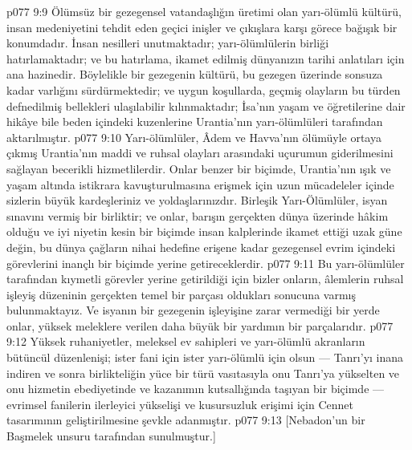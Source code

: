 \vs p077 9:9 Ölümsüz bir gezegensel vatandaşlığın üretimi olan yarı\hyp{}ölümlü kültürü, insan medeniyetini tehdit eden geçici inişler ve çıkışlara karşı görece bağışık bir konumdadır. İnsan nesilleri unutmaktadır; yarı\hyp{}ölümlülerin birliği hatırlamaktadır; ve bu hatırlama, ikamet edilmiş dünyanızın tarihi anlatıları için ana hazinedir. Böylelikle bir gezegenin kültürü, bu gezegen üzerinde sonsuza kadar varlığını sürdürmektedir; ve uygun koşullarda, geçmiş olayların bu türden defnedilmiş bellekleri ulaşılabilir kılınmaktadır; İsa’nın yaşam ve öğretilerine dair hikâye bile beden içindeki kuzenlerine Urantia’nın yarı\hyp{}ölümlüleri tarafından aktarılmıştır.
\vs p077 9:10 Yarı\hyp{}ölümlüler, Âdem ve Havva’nın ölümüyle ortaya çıkmış Urantia’nın maddi ve ruhsal olayları arasındaki uçurumun giderilmesini sağlayan becerikli hizmetlilerdir. Onlar benzer bir biçimde, Urantia’nın ışık ve yaşam altında istikrara kavuşturulmasına erişmek için uzun mücadeleler içinde sizlerin büyük kardeşleriniz ve yoldaşlarınızdır. Birleşik Yarı\hyp{}Ölümlüler, isyan sınavını vermiş bir birliktir; ve onlar, barışın gerçekten dünya üzerinde hâkim olduğu ve iyi niyetin kesin bir biçimde insan kalplerinde ikamet ettiği uzak güne değin, bu dünya çağların nihai hedefine erişene kadar gezegensel evrim içindeki görevlerini inançlı bir biçimde yerine getireceklerdir.
\vs p077 9:11 Bu yarı\hyp{}ölümlüler tarafından kıymetli görevler yerine getirildiği için bizler onların, âlemlerin ruhsal işleyiş düzeninin gerçekten temel bir parçası oldukları sonucuna varmış bulunmaktayız. Ve isyanın bir gezegenin işleyişine zarar vermediği bir yerde onlar, yüksek meleklere verilen daha büyük bir yardımın bir parçalarıdır.
\vs p077 9:12 Yüksek ruhaniyetler, meleksel ev sahipleri ve yarı\hyp{}ölümlü akranların bütüncül düzenlenişi; ister fani için ister yarı\hyp{}ölümlü için olsun --- Tanrı’yı inana indiren ve sonra birlikteliğin yüce bir türü vasıtasıyla onu Tanrı’ya yükselten ve onu hizmetin ebediyetinde ve kazanımın kutsallığında taşıyan bir biçimde --- evrimsel fanilerin ilerleyici yükselişi ve kusursuzluk erişimi için Cennet tasarımının geliştirilmesine şevkle adanmıştır.
\vs p077 9:13 [Nebadon’un bir Başmelek unsuru tarafından sunulmuştur.]
